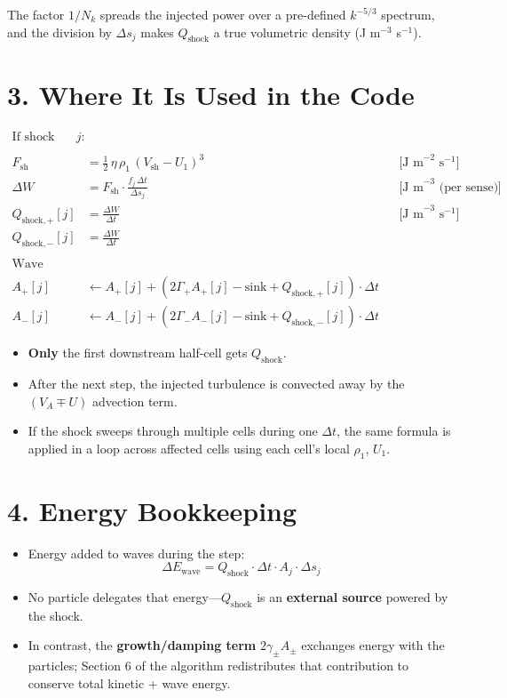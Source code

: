 The factor $1/N_k$ spreads the injected power over a pre-defined $k^{-5/3}$ spectrum, and the division by $\Delta s_j$ makes $Q_{\text{shock}}$ a true volumetric density (J m$^{-3}$ s$^{-1}$).

\section*{3. Where It Is Used in the Code}

\begin{align*}
\text{If shock just entered cell } j: \\
\\
F_{\text{sh}} &= \tfrac{1}{2} \, \eta \, \rho_1 \, (V_{\text{sh}} - U_1)^3 
&&\text{[J m}^{-2} \text{ s}^{-1}\text{]} \\
\Delta W &= F_{\text{sh}} \cdot \frac{f_j \, \Delta t}{\Delta s_j} 
&&\text{[J m}^{-3} \text{ (per sense)}] \\
Q_{\text{shock},+}[j] &= \frac{\Delta W}{\Delta t} 
&&\text{[J m}^{-3} \text{ s}^{-1}\text{]} \\
Q_{\text{shock},-}[j] &= \frac{\Delta W}{\Delta t} \\
\\
\text{Wave amplitude updates:} \\
A_+[j] &\leftarrow A_+[j] + \left(2 \Gamma_+ A_+[j] - \text{sink} + Q_{\text{shock},+}[j]\right) \cdot \Delta t \\
A_-[j] &\leftarrow A_-[j] + \left(2 \Gamma_- A_-[j] - \text{sink} + Q_{\text{shock},-}[j]\right) \cdot \Delta t
\end{align*}

\begin{itemize}
    \item \textbf{Only} the first downstream half-cell gets $Q_{\text{shock}}$.
    \item After the next step, the injected turbulence is convected away by the $(V_A \mp U)$ advection term.
    \item If the shock sweeps through multiple cells during one $\Delta t$, the same formula is applied in a loop across affected cells using each cell’s local $\rho_1$, $U_1$.
\end{itemize}

\section*{4. Energy Bookkeeping}

\begin{itemize}
    \item Energy added to waves during the step:
    \[
    \Delta E_{\text{wave}} = Q_{\text{shock}} \cdot \Delta t \cdot A_j \cdot \Delta s_j
    \]
    \item No particle delegates that energy—$Q_{\text{shock}}$ is an \textbf{external source} powered by the shock.
    \item In contrast, the \textbf{growth/damping term} $2\gamma_\pm A_\pm$ exchanges energy with the particles; Section 6 of the algorithm redistributes that contribution to conserve total kinetic + wave energy.
\end{itemize}

